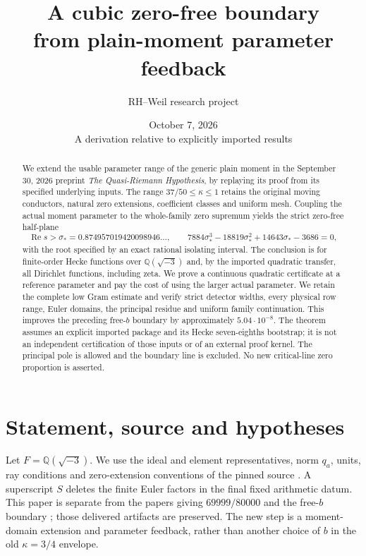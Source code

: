 \documentclass[11pt,a4paper]{article}
\title{A cubic zero-free boundary\\from plain-moment parameter feedback}
\author{RH--Weil research project}
\date{October 7, 2026\\[3pt]\small A derivation relative to explicitly imported results}
\theoremstyle{definition}
\newcommand{\Rea}{\operatorname{Re}}
\begin{document}
\maketitle
\begin{abstract}
We extend the usable parameter range of the generic plain moment
in the September 30, 2026 preprint \emph{The Quasi-Riemann Hypothesis},
by replaying its proof from its specified underlying inputs.
The range $37/50\le\kappa\le1$ retains the original moving conductors,
natural zero extensions, coefficient classes and uniform mesh.
Coupling the actual moment parameter to the whole-family zero
supremum yields the strict zero-free half-plane
\[
 \Rea s>\sigma_*=0.874957019420098946\ldots,
 \qquad
 7884\sigma_*^3-18819\sigma_*^2+14643\sigma_*-3686=0,
\]
with the root specified by an exact rational isolating interval.
The conclusion is for finite-order Hecke functions over
$\mathbb Q(\sqrt{-3})$ and, by the imported quadratic transfer,
all Dirichlet functions, including zeta. We prove a continuous
quadratic certificate at a reference parameter and pay the cost of
using the larger actual parameter. We retain the complete low Gram
estimate and verify strict detector widths, every physical row range,
Euler domains, the principal residue and uniform family continuation.
This improves the preceding free-$b$ boundary by approximately
$5.04\cdot10^{-8}$. The theorem assumes an explicit imported package
and its Hecke seven-eighths bootstrap; it is not an independent
certification of those inputs or of an external proof kernel.
The principal pole is allowed and the boundary line is excluded.
No new critical-line zero proportion is asserted.
\end{abstract}
\begingroup
\small
\tableofcontents
\endgroup

\section{Statement, source and hypotheses}
\label{sec:inputs}
Let $F=\mathbb Q(\sqrt{-3})$. We use the ideal and element
representatives, norm $q_a$, units, ray conditions and zero-extension
conventions of the pinned source \cite{OAI}. A superscript $S$ deletes
the finite Euler factors in the final fixed arithmetic datum.
This paper is separate from the papers giving $69999/80000$ and
the free-$b$ boundary \cite{Previous,FreeB}; those delivered artifacts
are preserved. The new step is a moment-domain extension and
parameter feedback, rather than another choice of $b$ in the old
$\kappa=3/4$ envelope.
\end{document}
